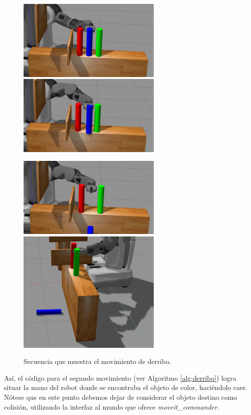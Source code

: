 \documentclass[12pt,spanish,chapterprefix, numbers=noenddot]{book}
\numberwithin{equation}{section}
\numberwithin{figure}{section}
\begin{document}
\begin{figure}[hbt!]
\centering
\includegraphics[width=7cm]{Figs/fase5_1.png}
\includegraphics[width=7cm]{Figs/fase5_2.png}
\par
\centering
\includegraphics[width=7cm]{Figs/fase5_3.png}
\includegraphics[width=7cm]{Figs/pose2_2.png}
\par
\caption{\label{fig:derribo}Secuencia que muestra el movimiento de derribo.}
\end{figure}

Así, el código para el segundo movimiento (ver Algoritmo \ref{alg:derribo}) logra situar la mano del robot donde se encontraba el objeto de color, haciéndolo caer. Nótese que en este punto debemos dejar de considerar el objeto destino como colisión, utilizando la interfaz al mundo que ofrece \textit{moveit\_commander}. 
\end{document}
